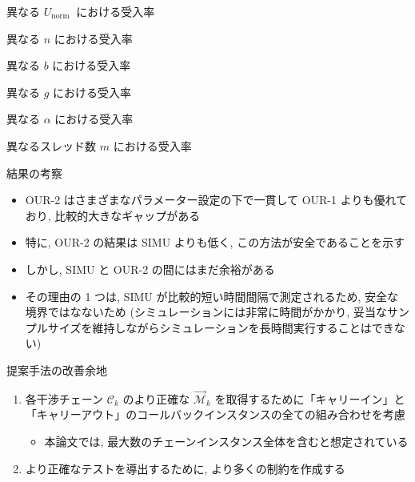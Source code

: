 \begin{frame}{異なる $U_{\text {norm }}$ における受入率}
\end{frame}

\begin{frame}{異なる $n$ における受入率}
\end{frame}

\begin{frame}{異なる $b$ における受入率}
\end{frame}

\begin{frame}{異なる $g$ における受入率}
\end{frame}

\begin{frame}{異なる $\alpha$ における受入率}
\end{frame}

\begin{frame}{異なるスレッド数 $m$ における受入率}
\end{frame}

\begin{frame}{結果の考察}
    \begin{itemize}
        \item OUR-2 はさまざまなパラメーター設定の下で一貫して OUR-1 よりも優れており, 比較的大きなギャップがある
        \item 特に, OUR-2 の結果は SIMU よりも低く, この方法が安全であることを示す
        \item しかし, SIMU と OUR-2 の間にはまだ余裕がある
        \item その理由の 1 つは, SIMU が比較的短い時間間隔で測定されるため, 安全な境界ではなないため (シミュレーションには非常に時間がかかり, 妥当なサンプルサイズを維持しながらシミュレーションを長時間実行することはできない)
    \end{itemize}
\end{frame}

\begin{frame}{提案手法の改善余地}
    \begin{enumerate}
        \item 各干渉チェーン $\mathcal{C}_{k}$ のより正確な $\overrightarrow{\mathcal{M}}_{k}$ を取得するために「キャリーイン」と「キャリーアウト」のコールバックインスタンスの全ての組み合わせを考慮
              \begin{itemize}
                  \item 本論文では, 最大数のチェーンインスタンス全体を含むと想定されている
              \end{itemize}
        \item より正確なテストを導出するために, より多くの制約を作成する
    \end{enumerate}
\end{frame}


